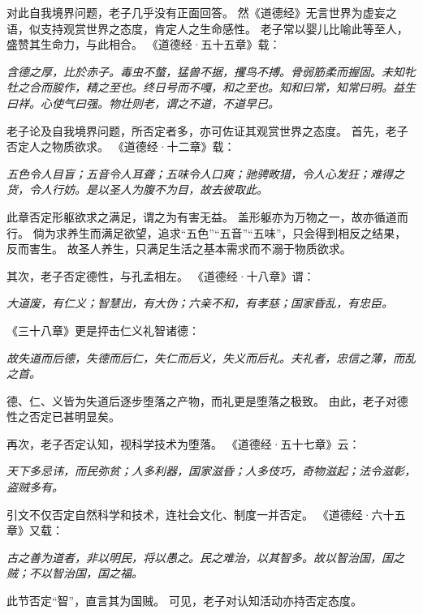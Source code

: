 \documentclass[11pt]{article}
\begin{document}
\par

对此自我境界问题，老子几乎没有正面回答。
然《道德经》无言世界为虚妄之语，似支持观赏世界之态度，肯定人之生命感性。
老子常以婴儿比喻此等至人，盛赞其生命力，与此相合。
《道德经·五十五章》载：

\textit{含德之厚，比於赤子。毒虫不螫，猛兽不据，攫鸟不搏。骨弱筋柔而握固。未知牝牡之合而朘作，精之至也。终日号而不嘎，和之至也。知和曰常，知常曰明。益生曰祥。心使气曰强。物壮则老，谓之不道，不道早已。}

\par

老子论及自我境界问题，所否定者多，亦可佐证其观赏世界之态度。
首先，老子否定人之物质欲求。
《道德经·十二章》载：

\textit{五色令人目盲；五音令人耳聋；五味令人口爽；驰骋畋猎，令人心发狂；难得之货，令人行妨。是以圣人为腹不为目，故去彼取此。}

此章否定形躯欲求之满足，谓之为有害无益。
盖形躯亦为万物之一，故亦循道而行。
倘为求养生而满足欲望，追求“五色”“五音”“五味”，只会得到相反之结果，反而害生。
故圣人养生，只满足生活之基本需求而不溺于物质欲求。

\par

其次，老子否定德性，与孔孟相左。
《道德经·十八章》谓：

\textit{大道废，有仁义；智慧出，有大伪；六亲不和，有孝慈；国家昏乱，有忠臣。}

《三十八章》更是抨击仁义礼智诸德：

\textit{故失道而后德，失德而后仁，失仁而后义，失义而后礼。夫礼者，忠信之薄，而乱之首。}

德、仁、义皆为失道后逐步堕落之产物，而礼更是堕落之极致。
由此，老子对德性之否定已甚明显矣。

\par

再次，老子否定认知，视科学技术为堕落。
《道德经·五十七章》云：

\textit{天下多忌讳，而民弥贫；人多利器，国家滋昏；人多伎巧，奇物滋起；法令滋彰，盗贼多有。}

引文不仅否定自然科学和技术，连社会文化、制度一并否定。
《道德经·六十五章》又载：

\textit{古之善为道者，非以明民，将以愚之。民之难治，以其智多。故以智治国，国之贼；不以智治国，国之福。}

此节否定“智”，直言其为国贼。
可见，老子对认知活动亦持否定态度。

\par
\end{document}

